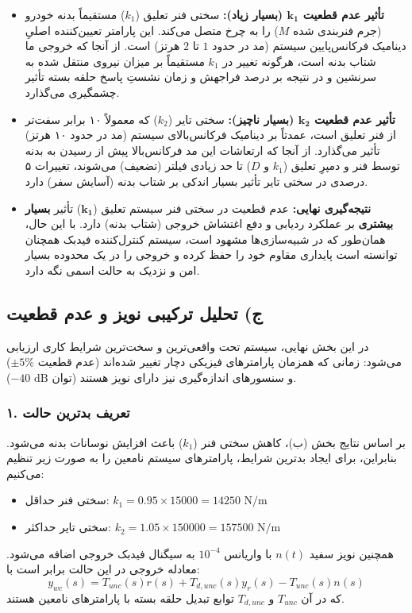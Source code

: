 \documentclass[a4paper]{article}
\begin{document}
\begin{itemize}
	\item \textbf{تأثیر عدم قطعیت $\mathbf{k_1}$ (بسیار زیاد):} سختی فنر تعلیق ($k_1$) مستقیماً بدنه خودرو (جرم فنربندی شده $M$) را به چرخ متصل می‌کند. این پارامتر تعیین‌کننده اصلیِ دینامیک فرکانس‌پایین سیستم (مد  در حدود $1$ تا $2$ هرتز) است. از آنجا که خروجی ما شتاب بدنه است، هرگونه تغییر در $k_1$ مستقیماً بر میزان نیروی منتقل شده به سرنشین و در نتیجه بر درصد فراجهش و زمان نشستِ پاسخ حلقه بسته تأثیر چشمگیری می‌گذارد.
	
	\item \textbf{تأثیر عدم قطعیت $\mathbf{k_2}$ (بسیار ناچیز):} سختی تایر ($k_2$) که معمولاً ۱۰ برابر سفت‌تر از فنر تعلیق است، عمدتاً بر دینامیک فرکانس‌بالای سیستم (مد  در حدود ۱۰ هرتز) تأثیر می‌گذارد. از آنجا که ارتعاشات این مد فرکانس‌بالا پیش از رسیدن به بدنه توسط فنر و دمپرِ تعلیق ($k_1$ و $D$) تا حد زیادی فیلتر (تضعیف) می‌شوند، تغییرات ۵ درصدی در سختی تایر تأثیر بسیار اندکی بر شتاب بدنه (آسایش سفر) دارد.
	
	\item \textbf{نتیجه‌گیری نهایی:} 
	عدم قطعیت در سختی فنر سیستم تعلیق (\textbf{$\mathbf{k_1}$}) تأثیر \textbf{بسیار بیشتری} بر عملکرد ردیابی و دفع اغتشاش خروجی (شتاب بدنه) دارد. با این حال، همان‌طور که در شبیه‌سازی‌ها مشهود است، سیستم کنترل‌کننده فیدبک همچنان توانسته است پایداری مقاوم  خود را حفظ کرده و خروجی را در یک محدوده بسیار امن و نزدیک به حالت اسمی نگه دارد.
\end{itemize}
\subsection{ج) تحلیل ترکیبی نویز و عدم قطعیت }

در این بخش نهایی، سیستم تحت واقعی‌ترین و سخت‌ترین شرایط کاری ارزیابی می‌شود: زمانی که همزمان پارامترهای فیزیکی دچار تغییر شده‌اند (عدم قطعیت $\pm 5\%$) و سنسورهای اندازه‌گیری نیز دارای نویز هستند (توان $-40\text{ dB}$).

\subsubsection*{۱. تعریف بدترین حالت }
بر اساس نتایج بخش (ب)، کاهش سختی فنر ($k_1$) باعث افزایش نوسانات بدنه می‌شود. بنابراین، برای ایجاد بدترین شرایط، پارامترهای سیستم نامعین را به صورت زیر تنظیم می‌کنیم:
\begin{itemize}
	\item سختی فنر حداقل: $k_1 = 0.95 \times 15000 = 14250 \text{ N/m}$
	\item سختی تایر حداکثر: $k_2 = 1.05 \times 150000 = 157500 \text{ N/m}$
\end{itemize}
همچنین نویز سفید $n(t)$ با واریانس $10^{-4}$ به سیگنال فیدبک خروجی اضافه می‌شود. معادله خروجی در این حالت برابر است با:
\begin{equation}
	y_{wc}(s) = T_{unc}(s) r(s) + T_{d,unc}(s) y_r(s) - T_{unc}(s) n(s)
\end{equation}
که در آن $T_{unc}$ و $T_{d,unc}$ توابع تبدیل حلقه بسته با پارامترهای نامعین هستند.
\end{document}
